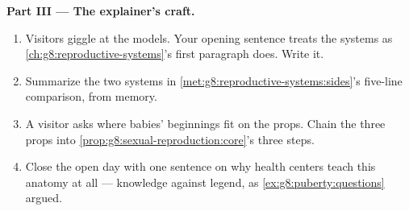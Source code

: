 \begin{problem}
\medskip\noindent\textbf{Part III --- The explainer's
craft.}
\begin{enumerate}[resume]
  \item Visitors giggle at the models. Your opening
        sentence treats the systems as
        \cref{ch:g8:reproductive-systems}'s first
        paragraph does. Write it.
  \item Summarize the two systems in
        \cref{met:g8:reproductive-systems:sides}'s
        five-line comparison, from memory.
  \item A visitor asks where babies' beginnings fit on
        the props. Chain the three props into
        \cref{prop:g8:sexual-reproduction:core}'s three
        steps.
  \item Close the open day with one sentence on why
        health centers teach this anatomy at all ---
        knowledge against legend, as
        \cref{ex:g8:puberty:questions} argued.
\end{enumerate}
\end{problem}
